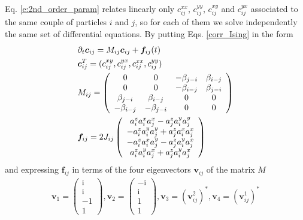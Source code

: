 \documentclass[aps,prl,showpacs,amsmath,amssymb,superscriptaddress,reprint,10pt]{revtex4-1}
\newcommand\ii{{\mathrm{i}}}
\newcommand{\mvec}[1]{\boldsymbol #1}
\begin{document}
Eq. \eqref{e:2nd_order_param} relates linearly only $c_{ij}^{xx}$, $c_{ij}^{yy}$, $c_{ij}^{xy}$ and $c_{ij}^{yx}$ associated to the same couple of particles $i$ and $j$, so for each of them we solve independently the
same set of differential equations. By putting Eqs. \eqref{corr_Ising} in the form
\begin{subequations}
\begin{align}
 &\partial_t\mvec{c_{ij}}=M_{ij}\mvec{c_{ij}}+\mvec{f_{ij}}(t)\\
 &\mvec{c_{ij}}^T=(c_{ij}^{xy},c_{ij}^{yx},c_{ij}^{xx},c_{ij}^{yy})\nonumber\\
 &M_{ij}=\left(\begin{array}{c c c c}
   0 & 0 & -\beta_{j-i} & \beta_{i-j}\\
   0 & 0 & -\beta_{i-j} & \beta_{j-i}\\
   \beta_{j-i} & \beta_{i-j} & 0 & 0 \\
   -\beta_{i-j} & -\beta_{j-i} & 0 & 0 
  \end{array}\right)\nonumber\\
 &\mvec{f_{ij}}=2J_{ij}\left(\begin{array}{c}
                      a_i^za_i^xa_j^x-a_j^za_i^ya_j^y\\
                      -a_i^za_i^ya_j^y+a_j^za_i^xa_j^x\\
                      -a_i^za_i^xa_j^y-a_j^za_i^ya_j^x\\
                      a_i^za_i^ya_j^x+a_j^za_i^ya_j^x
                      \end{array}
 \right)\nonumber
\end{align}
\end{subequations}
and expressing $\mvec{f_{ij}}$ in terms of the four eigenvectors $\mvec{v_{ij}}$ of the matrix $M$
\begin{subequations}
\begin{align}
 \mvec{v_1}=\left(\begin{array}{c}
                        \ii\\
                        \ii\\
                        -1\\
                        1
                       \end{array}\right),
 \mvec{v_2}=\left(\begin{array}{c}
                        -\ii\\
                        \ii\\
                        1\\
                        1
                       \end{array}\right),
 \mvec{v_3}=(\mvec{v_{ij}^2})^*,
 \mvec{v_4}=(\mvec{v_{ij}^1})^*
\end{align}
\end{subequations}
\end{document}
